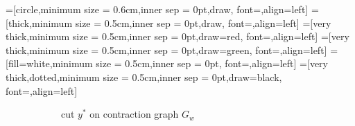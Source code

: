 
=[circle,minimum size = 0.6cm,inner sep = 0pt,draw, font=\small,align=left]
=[thick,minimum size = 0.5cm,inner sep = 0pt,draw, font=\small,align=left]
=[very thick,minimum size = 0.5cm,inner sep = 0pt,draw=red, font=\small,align=left]
=[very thick,minimum size = 0.5cm,inner sep = 0pt,draw=green, font=\small,align=left]
=[fill=white,minimum size = 0.5cm,inner sep = 0pt, font=\tiny,align=left]
=[very thick,dotted,minimum size = 0.5cm,inner sep = 0pt,draw=black, font=\small,align=left]

\begin{center}
\begin{figure}[h]
\begin{subfigure}[t]{0.4\linewidth}
\caption{ cut $y^*$ on contraction graph $G_w$ }
\label{fig:cont_c}
\end{subfigure}
\hfill
\begin{subfigure}[t]{0.4\linewidth}
\end{subfigure}
\end{figure}
\end{center}
